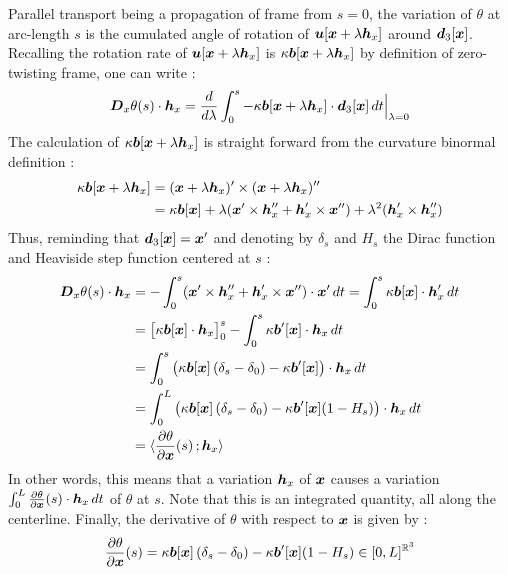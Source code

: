 Parallel transport being a propagation of frame from $s = 0$, the variation of $\theta$ at arc-length $s$ is the cumulated angle of rotation of $\boldsymbol{u}[\boldsymbol{x} + \lambda\boldsymbol{h}_x]$ around $\boldsymbol{d}_3[\boldsymbol{x}]$. Recalling the rotation rate of $\boldsymbol{u}[\boldsymbol{x} + \lambda\boldsymbol{h}_x]$ is $\kappa\boldsymbol{b}[\boldsymbol{x} + \lambda\boldsymbol{h}_x]$ by definition of zero-twisting frame, one can write :
\begin{equation}
	\boldsymbol{D}_x\theta(s)\cdot\boldsymbol{h}_x =
	\frac{d}{d\lambda} \int_0^s -\kappa\boldsymbol{b}[\boldsymbol{x} + \lambda\boldsymbol{h}_x] \cdot \boldsymbol{d}_3[\boldsymbol{x}] \,dt \Bigr|_{\lambda = 0}
\end{equation}
The calculation of $\kappa\boldsymbol{b}[\boldsymbol{x} + \lambda\boldsymbol{h}_x]$ is straight forward from the curvature binormal definition :
\begin{equation}
	\begin{aligned}
	\kappa\boldsymbol{b}[\boldsymbol{x} + \lambda\boldsymbol{h}_x]
	&= (\boldsymbol{x} + \lambda\boldsymbol{h}_x)' \times (\boldsymbol{x} + \lambda\boldsymbol{h}_x)'' \\
	&= \kappa\boldsymbol{b}[\boldsymbol{x}] + \lambda(\boldsymbol{x}'\times\boldsymbol{h}''_x + \boldsymbol{h}'_x\times\boldsymbol{x}'') + \lambda^2(\boldsymbol{h}'_x \times \boldsymbol{h}''_x)
	\end{aligned}
\end{equation}
Thus, reminding that $\boldsymbol{d}_3[\boldsymbol{x}] = \boldsymbol{x}'$ and denoting by $\delta_s$ and $H_s$ the Dirac function and Heaviside step function centered at $s$ :
\begin{equation}
	\begin{aligned}
		\boldsymbol{D}_x\theta(s)\cdot\boldsymbol{h}_x &= - \int_0^s (\boldsymbol{x}'\times\boldsymbol{h}''_x + \boldsymbol{h}'_x\times\boldsymbol{x}'') \cdot \boldsymbol{x}' \,dt = \int_0^s \kappa\boldsymbol{b}[\boldsymbol{x}] \cdot  \boldsymbol{h}'_x \,dt\\
		&= \big[\kappa\boldsymbol{b}[\boldsymbol{x}] \cdot  \boldsymbol{h}_x \big]_0^s - \int_0^s \kappa\boldsymbol{b}'[\boldsymbol{x}] \cdot  \boldsymbol{h}_x \,dt \\
		&= \int_0^s \left(\kappa\boldsymbol{b}[\boldsymbol{x}]\left(\delta_s-\delta_0\right) - \kappa\boldsymbol{b}'[\boldsymbol{x}]\right)\cdot  \boldsymbol{h}_x \,dt \\
		&= \int_0^L \left(\kappa\boldsymbol{b}[\boldsymbol{x}]\left(\delta_s-\delta_0\right) - \kappa\boldsymbol{b}'[\boldsymbol{x}](1-H_s)\right)\cdot  \boldsymbol{h}_x \,dt \\
		&= \langle \frac{\partial\theta}{\partial\boldsymbol{x}}(s)\,; \boldsymbol{h}_x\rangle
	\end{aligned}
\end{equation}
In other words, this means that a variation $\boldsymbol{h}_x$ of $\boldsymbol{x}$ causes a variation $\int_0^L \frac{\partial\theta}{\partial\boldsymbol{x}}(s) \cdot  \boldsymbol{h}_x \,dt $ of $\theta$ at $s$. Note that this is an integrated quantity, all along the centerline. Finally, the derivative of $\theta$ with respect to $\boldsymbol{x}$ is given by :
\begin{equation}
	\frac{\partial\theta}{\partial\boldsymbol{x}}(s) = \kappa\boldsymbol{b}[\boldsymbol{x}]\left(\delta_s-\delta_0\right) - \kappa\boldsymbol{b}'[\boldsymbol{x}](1-H_s) \in [0,L]^{\mathbb{R}^3}
\end{equation}

